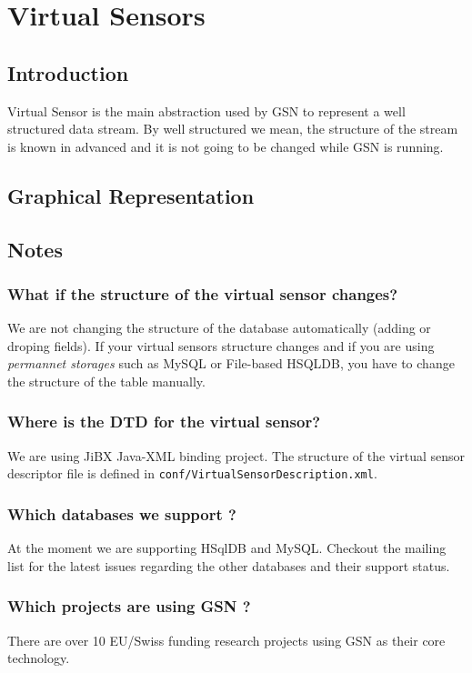 \graphicspath{{chapters/ch-virtualsensors/figures/}}
\chapter{Virtual Sensors}
\section{Introduction}
Virtual Sensor is the main abstraction used by GSN to represent a well structured data stream.
By well structured we mean, the structure of the stream is known in advanced and it is not going to be changed
while GSN is running.
\section{Graphical Representation}
\section{}

\section{Notes}
\subsection{What if the structure of the virtual sensor changes?}
We are not changing the structure of the database automatically (adding or droping fields). If your virtual sensors structure
changes and if you are using \emph{permannet storages} such as MySQL or File-based HSQLDB, you have to change the structure of the
table manually. 
\subsection{Where is the DTD for the virtual sensor?}
We are using JiBX Java-XML binding project. The structure of the virtual sensor descriptor file is defined in \texttt{conf/VirtualSensorDescription.xml}.
\subsection{Which databases we support ?}
At the moment we are supporting HSqlDB and MySQL. Checkout the mailing list for the latest issues regarding the other databases and their
support status.
\subsection{Which projects are using GSN ?}
There are over 10 EU/Swiss funding research projects using GSN as their core technology.
